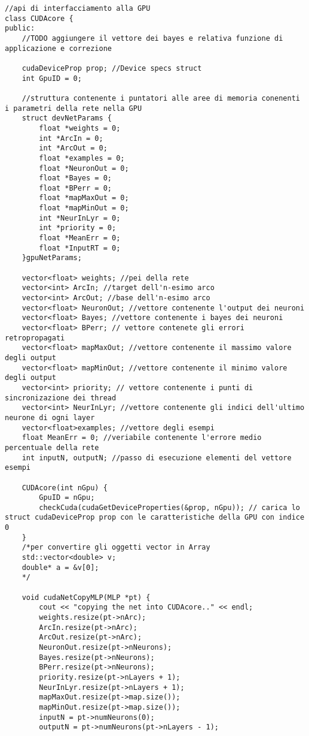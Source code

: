 \documentclass[10pt,a4paper]{article}
\begin{document}
\begin{lstlisting}[style=mycuda, caption=librerie usate, captionpos=b]
//api di interfacciamento alla GPU
class CUDAcore {
public:
	//TODO aggiungere il vettore dei bayes e relativa funzione di applicazione e correzione

	cudaDeviceProp prop; //Device specs struct
	int GpuID = 0;

	//struttura contenente i puntatori alle aree di memoria conenenti i parametri della rete nella GPU
	struct devNetParams {
		float *weights = 0;
		int *ArcIn = 0;
		int *ArcOut = 0;
		float *examples = 0;
		float *NeuronOut = 0;
		float *Bayes = 0;
		float *BPerr = 0;
		float *mapMaxOut = 0;
		float *mapMinOut = 0;
		int *NeurInLyr = 0;
		int *priority = 0;
		float *MeanErr = 0;
		float *InputRT = 0;
	}gpuNetParams;

	vector<float> weights; //pei della rete
	vector<int> ArcIn; //target dell'n-esimo arco
	vector<int> ArcOut; //base dell'n-esimo arco
	vector<float> NeuronOut; //vettore contenente l'output dei neuroni
	vector<float> Bayes; //vettore contenente i bayes dei neuroni
	vector<float> BPerr; // vettore contenete gli errori retropropagati
	vector<float> mapMaxOut; //vettore contenente il massimo valore degli output
	vector<float> mapMinOut; //vettore contenente il minimo valore degli output
	vector<int> priority; // vettore contenente i punti di sincronizazione dei thread
	vector<int> NeurInLyr; //vettore contenente gli indici dell'ultimo neurone di ogni layer
	vector<float>examples; //vettore degli esempi
	float MeanErr = 0; //veriabile contenente l'errore medio percentuale della rete
	int inputN, outputN; //passo di esecuzione elementi del vettore esempi

	CUDAcore(int nGpu) {
		GpuID = nGpu;
		checkCuda(cudaGetDeviceProperties(&prop, nGpu)); // carica lo struct cudaDeviceProp prop con le caratteristiche della GPU con indice 0
	}
	/*per convertire gli oggetti vector in Array
	std::vector<double> v;
	double* a = &v[0];
	*/

	void cudaNetCopyMLP(MLP *pt) {
		cout << "copying the net into CUDAcore.." << endl;
		weights.resize(pt->nArc);
		ArcIn.resize(pt->nArc);
		ArcOut.resize(pt->nArc);
		NeuronOut.resize(pt->nNeurons);
		Bayes.resize(pt->nNeurons);
		BPerr.resize(pt->nNeurons);
		priority.resize(pt->nLayers + 1);
		NeurInLyr.resize(pt->nLayers + 1);
		mapMaxOut.resize(pt->map.size());
		mapMinOut.resize(pt->map.size());
		inputN = pt->numNeurons(0);
		outputN = pt->numNeurons(pt->nLayers - 1);


\end{lstlisting}
\end{document}
